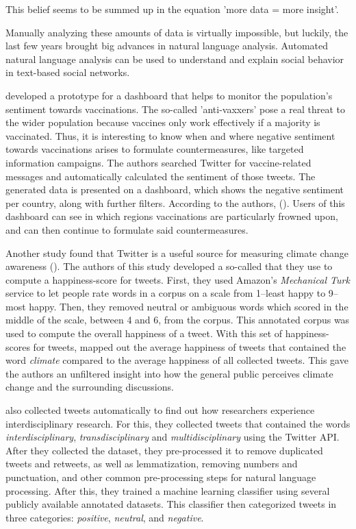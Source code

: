 This belief seems to be summed up in the equation 'more data = more insight'.

Manually analyzing these amounts of data is virtually impossible, but luckily, the last few years brought big advances in natural language analysis. Automated natural language analysis can be used to understand and explain social behavior in text-based social networks.

\citeauthor{bahk2016publicly} developed a prototype for a dashboard that helps to monitor the population's sentiment towards vaccinations. The so-called 'anti-vaxxers' pose a real threat to the wider population because vaccines only work effectively if a majority is vaccinated. Thus, it is interesting to know when and where negative sentiment towards vaccinations arises to formulate countermeasures, like targeted information campaigns. The authors searched Twitter for vaccine-related messages and automatically calculated the sentiment of those tweets. The generated data is presented on a dashboard, which shows the negative sentiment per country, along with further filters. According to the authors,  (\cite[343]{bahk2016publicly}). Users of this dashboard can see in which regions vaccinations are particularly frowned upon, and can then continue to formulate said countermeasures.

Another study found that Twitter is a useful source for measuring climate change awareness (\cite{codyClimateChangeSentiment2015}). The authors of this study developed a so-called  that they use to compute a happiness-score for tweets. First, they used Amazon's \emph{Mechanical Turk} service to let people rate words in a corpus on a scale from 1--least happy to 9--most happy. Then, they removed neutral or ambiguous words which scored in the middle of the scale, between 4 and 6, from the corpus. This annotated corpus was used to compute the overall happiness of a tweet. With this set of happiness-scores for tweets, \citeauthor{codyClimateChangeSentiment2015} mapped out the average happiness of tweets that contained the word \emph{climate} compared to the average happiness of all collected tweets. This gave the authors an unfiltered insight into how the general public perceives climate change and the surrounding discussions.

\citeauthor{weberInterdisciplinaryOptimismSentiment2019} also collected tweets automatically to find out how researchers experience interdisciplinary research. For this, they collected tweets that contained the words \emph{interdisciplinary}, \emph{transdisciplinary} and \emph{multidisciplinary} using the Twitter API. After they collected the dataset, they pre-processed it to remove duplicated tweets and retweets, as well as lemmatization, removing numbers and punctuation, and other common pre-processing steps for natural language processing. After this, they trained a machine learning classifier using several publicly available annotated datasets. This classifier then categorized tweets in three categories: \emph{positive}, \emph{neutral}, and \emph{negative}.

